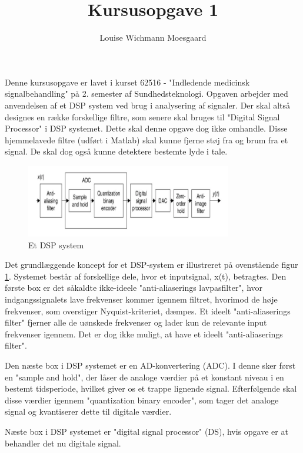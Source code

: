 \documentclass[a4paper]{report}
\title{Kursusopgave 1}
\author{Louise Wichmann Moesgaard}
\begin{document}
\maketitle
    


\newpage

Denne kursusopgave er lavet i kurset 62516 - "Indledende medicinsk signalbehandling" på 2. semester af Sundhedsteknologi.  Opgaven arbejder med anvendelsen af et DSP system ved brug i analysering af signaler. Der skal altså designes en række forskellige filtre, som senere skal bruges til "Digital Signal Processor" i DSP systemet. Dette skal denne opgave dog ikke omhandle. 
Disse hjemmelavede filtre (udført i Matlab) skal kunne fjerne støj fra og brum fra et signal. De skal dog også kunne detektere bestemte lyde i tale. 


\begin{figure}[H] 
\centering
\includegraphics[width=0.8\textwidth]{grafer/Opgave1}
\caption{Et DSP system} \label{Opgave1}
\end{figure}

Det grundlæggende koncept for et DSP-system er illustreret på ovenstående figur \ref{Opgave1}. Systemet består af forskellige dele, hvor et inputsignal, x(t), betragtes. Den første box er det såkaldte ikke-ideele "anti-aliaserings lavpasfilter", hvor indgangssignalets lave frekvenser kommer igennem filtret, hvorimod de høje frekvenser, som overstiger Nyquist-kriteriet, dæmpes. Et ideelt "anti-aliaserings filter" fjerner alle de uønskede frekvenser og lader kun de relevante input frekvenser igennem. Det er dog ikke muligt, at have et ideelt "anti-aliaserings filter". 

Den næste box i DSP systemet er en AD-konvertering (ADC). I denne sker først en "sample and hold", der låser de analoge værdier på et konstant niveau i en bestemt tidsperiode, hvilket giver os et trappe lignende signal. Efterfølgende skal disse værdier igennem  "quantization binary encoder", som tager det analoge signal og kvantiserer dette til digitale værdier.

Næste box i DSP systemet er "digital signal processor" (DS), hvis opgave er at behandler det nu digitale signal.
\end{document}
